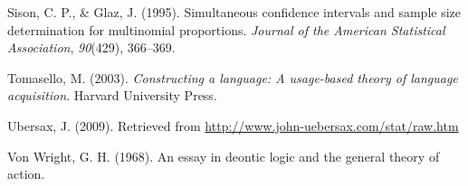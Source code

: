 \documentclass[floatsintext,man]{apa6}
\theoremstyle{definition}
\theoremstyle{definition}
\theoremstyle{definition}
\theoremstyle{remark}
\begin{document}
\hypertarget{ref-sison1995simultaneous}{}
Sison, C. P., \& Glaz, J. (1995). Simultaneous confidence intervals and
sample size determination for multinomial proportions. \emph{Journal of
the American Statistical Association}, \emph{90}(429), 366--369.

\hypertarget{ref-tomasello2003constructing}{}
Tomasello, M. (2003). \emph{Constructing a language: A usage-based
theory of language acquisition}. Harvard University Press.

\hypertarget{ref-ubersax2009}{}
Ubersax, J. (2009). Retrieved from
\url{http://www.john-uebersax.com/stat/raw.htm}

\hypertarget{ref-von1968essay}{}
Von Wright, G. H. (1968). An essay in deontic logic and the general
theory of action.
\end{document}
